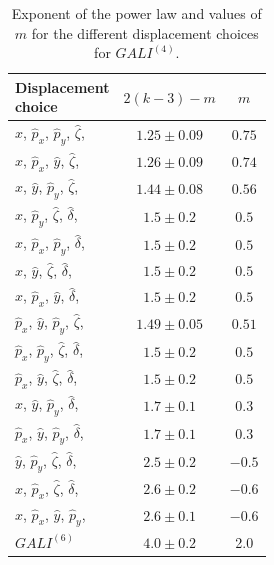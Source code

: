 \begin{table}
    \centering
    \setlength{\extrarowheight}{2pt}
    \begin{tabular}{l|cc}
        \toprule
        \makecell{Displacement\\choice} & $2(k-3)-m$ & $m$ \\
        \midrule
        $\hat{x}$, $\hat{p}_x$, $\hat{p}_y$, $\hat{\zeta}$, & $1.25 \pm 0.09$ & $0.75$ \\
        $\hat{x}$, $\hat{p}_x$, $\hat{y}$, $\hat{\zeta}$, & $1.26 \pm 0.09$ & $0.74$ \\
        $\hat{x}$, $\hat{y}$, $\hat{p}_y$, $\hat{\zeta}$, & $1.44 \pm 0.08$ & $0.56$ \\
        $\hat{x}$, $\hat{p}_y$, $\hat{\zeta}$, $\hat{\delta}$, & $1.5 \pm 0.2$ & $0.5$ \\
        $\hat{x}$, $\hat{p}_x$, $\hat{p}_y$, $\hat{\delta}$, & $1.5 \pm 0.2$ & $0.5$ \\
        $\hat{x}$, $\hat{y}$, $\hat{\zeta}$, $\hat{\delta}$, & $1.5 \pm 0.2$ & $0.5$ \\
        $\hat{x}$, $\hat{p}_x$, $\hat{y}$, $\hat{\delta}$, & $1.5 \pm 0.2$ & $0.5$ \\
        $\hat{p}_x$, $\hat{y}$, $\hat{p}_y$, $\hat{\zeta}$, & $1.49 \pm 0.05$ & $0.51$ \\
        $\hat{p}_x$, $\hat{p}_y$, $\hat{\zeta}$, $\hat{\delta}$, & $1.5 \pm 0.2$ & $0.5$ \\
        $\hat{p}_x$, $\hat{y}$, $\hat{\zeta}$, $\hat{\delta}$, & $1.5 \pm 0.2$ & $0.5$ \\
        $\hat{x}$, $\hat{y}$, $\hat{p}_y$, $\hat{\delta}$, & $1.7 \pm 0.1$ & $0.3$ \\
        $\hat{p}_x$, $\hat{y}$, $\hat{p}_y$, $\hat{\delta}$, & $1.7 \pm 0.1$ & $0.3$ \\
        $\hat{y}$, $\hat{p}_y$, $\hat{\zeta}$, $\hat{\delta}$, & $2.5 \pm 0.2$ & $-0.5$ \\
        $\hat{x}$, $\hat{p}_x$, $\hat{\zeta}$, $\hat{\delta}$, & $2.6 \pm 0.2$ & $-0.6$ \\
        $\hat{x}$, $\hat{p}_x$, $\hat{y}$, $\hat{p}_y$, & $2.6 \pm 0.1$ & $-0.6$ \\
        \midrule
        $GALI^{(6)}$ & $4.0 \pm 0.2$ &  2.0 \\   
        \bottomrule     
    \end{tabular}
    \caption{Exponent of the power law and values of $m$ for the different displacement choices for $GALI^{(4)}$.}
\end{table}

